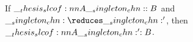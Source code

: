 
\begin{theorem}[Preservation]
  If $\slcof{A |- \chn : B}$ and $\chn \reduces \chn'$, then $\slcof{A |- \chn' : B}$.
\end{theorem}

